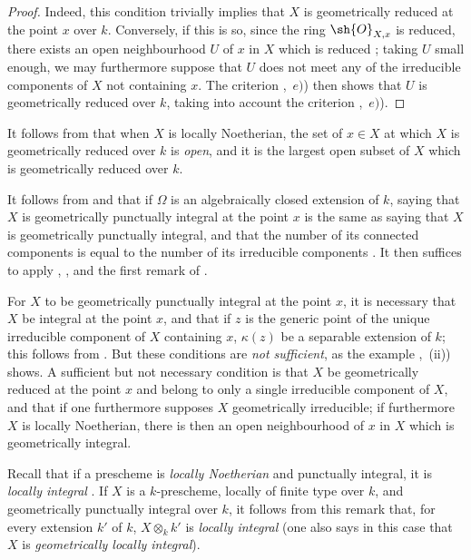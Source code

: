 \begin{proof}
Indeed, this condition trivially implies that $X$ is geometrically reduced at the point $x$ over $k$.
Conversely, if this is so, since the ring $\sh{O}_{X,x}$ is reduced, there exists an open neighbourhood $U$ of $x$ in $X$ which is reduced ; taking $U$ small enough, we may furthermore suppose that $U$ does not meet any of the irreducible components of $X$ not containing $x$.
The criterion ,~$e)$) then shows that $U$ is geometrically reduced over $k$, taking into account the criterion ,~$e)$).
\end{proof}

It follows from  that when $X$ is locally Noetherian, the set of $x\in X$ at which $X$ is geometrically reduced over $k$ is \emph{open}, and it is the largest open subset of $X$ which is geometrically reduced over $k$.

\begin{env}[4.6.14]
\label{IV.4.6.14}
It follows from  and  that if $\Omega$ is an algebraically closed extension of $k$, saying that $X$ is geometrically punctually integral at the point $x$ is the same as saying that $X$ is geometrically punctually integral, and that the number of its connected components is equal to the number of its irreducible components .
It then suffices to apply , , and the first remark of .

For $X$ to be geometrically punctually integral at the point $x$, it is necessary that $X$ be integral at the point $x$, and that if $z$ is the generic point of the unique irreducible component of $X$ containing $x$, $\kappa(z)$ be a separable extension of $k$; this follows from .
But these conditions are \emph{not sufficient}, as the example ,~(ii)) shows.
A sufficient but not necessary condition is that $X$ be geometrically reduced at the point $x$ and belong to only a single irreducible component of $X$, and that
if one furthermore supposes $X$ geometrically irreducible; if furthermore $X$ is locally Noetherian, there is then an open neighbourhood of $x$ in $X$ which is geometrically integral.
\end{env}

Recall that if a prescheme is \emph{locally Noetherian} and punctually integral, it is \emph{locally integral} .
If $X$ is a $k$-prescheme, locally of finite type over $k$, and geometrically punctually integral over $k$, it follows from this remark that, for every extension $k'$ of $k$, $X\otimes_k k'$ is \emph{locally integral} (one also says in this case that $X$ is \emph{geometrically locally integral}).

